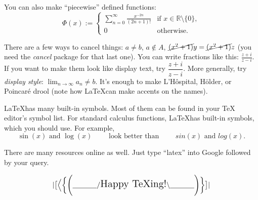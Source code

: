 \noindent
You can also make ``piecewise'' defined functions:
\[
\Phi(x):=
\left\{
\begin{array}{ll}
\sum_{n=0}^\infty\frac{x^{-2n}}{(2n+1)!}  & \text{if }x\in\mathbb{R}\setminus\{0\},\\
0 & \text{otherwise.}
\end{array}
\right. 
\]


\noindent There are a few ways to cancel things: 
$a\neq b$, $a\not\in A$, $\cancel{(x^2+1)}y=\cancel{(x^2+1)}z$ (you need the \emph{cancel} package for that last one).    
You can write fractions like this: $\frac{z+i}{z-i}$.  
If you want to make them look like display text, try $\dfrac{z+i}{z-i}$.  
More generally, try \emph{display style}: 
$\displaystyle{\lim_{n\rightarrow\infty}a_n}\neq b$. 
It's enough to make L'H\^ospital, H\"older, or Poincar\'e drool (note how \LaTeX can make accents on the names).

\LaTeX has many built-in symbols.  Most of them can be found in your TeX editor's symbol list.  For standard calculus functions, \LaTeX has built-in symbols, which you should use.  For example, 
\[
 \sin(x) \text{ and } \log(x)
 \qquad\text{ look better than }\qquad
 sin(x) \text{ and } log(x).
\]

There are many resources online as well. Just type ``latex'' into Google followed by your query.

\[
|
\big[\Big<\bigg\{\Bigg(
\underline{\hspace{1.2cm}}
/ \text{\Large{Happy TeXing!}} \backslash
\underline{\hspace{1.2cm}}
\Bigg)\bigg\}\Big.\big]
|
\]


\begin{scriptsize}

\end{scriptsize}


